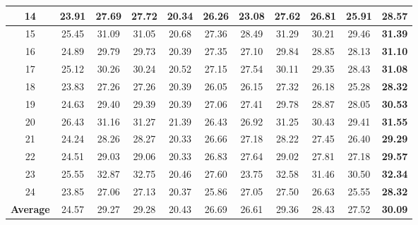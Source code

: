 \documentclass[10pt,onecolumn,letterpaper]{article}
\begin{document}
\begin{table}
\begin{center}
\begin{tabular}{|c||c|c|c|c|c|c|c|c|c|c|}
\hline
14& 23.91 & 27.69 & 27.72 & 20.34 & 26.26 & 23.08 & 27.62 & 26.81 & 25.91 & \textbf{28.57}
\\
\hline
15& 25.45 & 31.09 & 31.05 & 20.68 & 27.36 & 28.49 & 31.29 & 30.21 & 29.46 & \textbf{31.39}
\\
\hline
16& 24.89 & 29.79 & 29.73 & 20.39 & 27.35 & 27.10 & 29.84 & 28.85 & 28.13 & \textbf{31.10}
\\
\hline
17& 25.12 & 30.26 & 30.24 & 20.52 & 27.15 & 27.54 & 30.11 & 29.35 & 28.43 & \textbf{31.08}
\\
\hline
18& 23.83 & 27.26 & 27.26 & 20.39 & 26.05 & 26.15 & 27.32 & 26.18 & 25.28 & \textbf{28.32}
\\
\hline
19& 24.63 & 29.40 & 29.39 & 20.39 & 27.06 & 27.41 & 29.78 & 28.87 & 28.05 & \textbf{30.53}
\\
\hline
20& 26.43 & 31.16 & 31.27 & 21.39 & 26.43 & 26.92 & 31.25 & 30.43 & 29.41 & \textbf{31.55}
\\
\hline
21& 24.24 & 28.26 & 28.27 & 20.33 & 26.66 & 27.18 & 28.22 & 27.45 & 26.40 & \textbf{29.29}
\\
\hline
22& 24.51 & 29.03 & 29.06 & 20.33 & 26.83 & 27.64 & 29.02 & 27.81 & 27.18 & \textbf{29.57}
\\
\hline
23& 25.55 & 32.87 & 32.75 & 20.46 & 27.60 & 23.75 & 32.58 & 31.46 & 30.50 & \textbf{32.34}
\\
\hline
24& 23.85 & 27.06 & 27.13 & 20.37 & 25.86 & 27.05 & 27.50 & 26.63 & 25.55 & \textbf{28.32}
\\
\hline
\textbf{Average}
& 24.57 & 29.27 & 29.28 & 20.43 & 26.69 & 26.61 & 29.36 & 28.43 & 27.52 & \textbf{30.09}
\\
\hline
\end{tabular}
\end{center}
\end{table}
\end{document}
